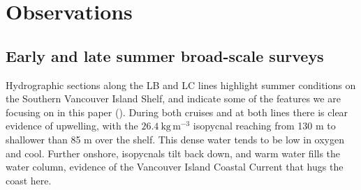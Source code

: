 \documentclass[draft]{agujournal2019}
\begin{document}
\section{Observations}
\label{sec:Observations}

\subsection{Early and late summer broad-scale surveys}

Hydrographic sections along the LB and LC lines highlight summer conditions on the Southern Vancouver Island Shelf, and indicate some of the features we are focusing on in this paper ().  During both cruises and at both lines there is clear evidence of upwelling, with the $26.4\ \mathrm{kg\,m^{-3}}$ isopycnal reaching from 130 m to shallower than 85 m over the shelf.  This dense water tends to be low in oxygen and cool. Further onshore, isopycnals tilt back down, and warm water fills the water column, evidence of the Vancouver Island Coastal Current that hugs the coast here.
\end{document}
